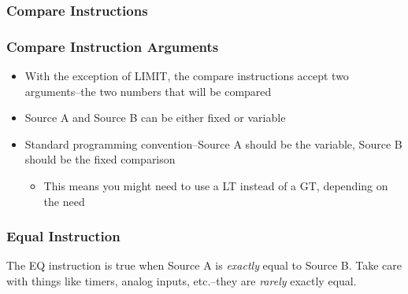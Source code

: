 \begin{frame}
    \frametitle{Compare Instructions}

    \begin{figure}
        \centering
        \resizebox{0.625\linewidth}{!}{
            
        }
    \end{figure}
\end{frame}

\begin{frame}
    \frametitle{Compare Instruction Arguments}

    \begin{itemize}
        \item With the exception of LIMIT, the compare instructions accept two arguments--the two numbers that will be compared
        \item Source A and Source B can be either fixed or variable
        \item Standard programming convention--Source A should be the variable, Source B should be the fixed comparison
        \begin{itemize}
            \item This means you might need to use a LT instead of a GT, depending on the need
        \end{itemize}
    \end{itemize}
\end{frame}

\begin{frame}
    \frametitle{Equal Instruction}

    \begin{figure}
        \centering
        \resizebox{0.625\linewidth}{!}{
            
        }

        \resizebox{0.625\linewidth}{!}{
            
        }

        \resizebox{0.625\linewidth}{!}{
        
        }
    \end{figure}

    \vspace{0.5em}
    \centering
    {\footnotesize The EQ instruction is true when Source A is \emph{exactly} equal to Source B. Take care with things like timers, analog inputs, etc.--they are \emph{rarely} exactly equal.\par}
\end{frame}

